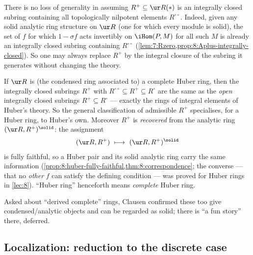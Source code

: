 \begin{remark}
\label{rmk:9:integrally-closed}
There is no loss of generality in assuming $R^{+}\subseteq\ur R(\ast)$ is an
integrally closed subring containing all topologically nilpotent elements
$R^{\circ\circ}$. Indeed, given any solid analytic ring structure on $\ur R$
(one for which every module is solid), the set of $f$ for which
$1-\sigma f$ acts invertibly on $\iHom(P,M)$ for all such $M$ is already an
integrally closed subring containing $R^{\circ\circ}$
(\cref{lem:7:Rzero,prop:8:Aplus-integrally-closed}). So one may always replace
$R^{+}$ by the integral closure of the subring it generates without changing the
theory.
\end{remark}

\begin{example}
\label{ex:9:huber-pair}
If $\ur R$ is (the condensed ring associated to) a complete Huber ring, then the
integrally closed subrings $R^{+}$ with $R^{\circ\circ}\subseteq R^{+}\subseteq
R^{\circ}$ are the same as the \emph{open} integrally closed subrings
$R^{+}\subseteq R^{\circ}$ --- exactly the rings of integral elements of Huber's
theory. So the general classification of admissible $R^{+}$ specialises,
for a Huber ring, to Huber's own. Moreover $R^{+}$ is \emph{recovered} from the
analytic ring $(\ur R,R^{+})^{\solid}$: the assignment
\begin{equation*}
(\ur R,R^{+})\ \longmapsto\ (\ur R,R^{+})^{\solid}
\end{equation*}
is fully faithful, so a Huber pair and its solid analytic ring carry the same
information (\cref{prop:8:huber-fully-faithful,thm:8:correspondence};
the converse --- that no \emph{other} $f$ can satisfy the defining condition ---
was proved for Huber rings in \cref{lec:8}). ``Huber ring'' henceforth means
\emph{complete} Huber ring.
\end{example}

\begin{remark}
\label{rmk:9:derived-complete}
Asked about ``derived complete'' rings, Clausen confirmed these too give
condensed/analytic objects and can be regarded as solid; there is ``a fun
story'' there, deferred.
\end{remark}

\subsection{Localization: reduction to the discrete case}

